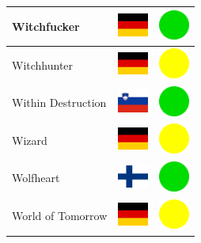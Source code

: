 \documentclass[12pt, a4paper, twoside]{report}
\begin{document}
\begin{center}
\begin{longtable}{|p{5cm}|p{2cm}|p{2cm}|}
Witchfucker & \includegraphics[width=1cm]{4x3/de} & \includegraphics[width=1cm]{likes/y} \\ \hline
Witchhunter & \includegraphics[width=1cm]{4x3/de} & \includegraphics[width=1cm]{likes/m} \\ \hline
Within Destruction & \includegraphics[width=1cm]{4x3/si} & \includegraphics[width=1cm]{likes/y} \\ \hline
Wizard & \includegraphics[width=1cm]{4x3/de} & \includegraphics[width=1cm]{likes/m} \\ \hline
Wolfheart & \includegraphics[width=1cm]{4x3/fi} & \includegraphics[width=1cm]{likes/y} \\ \hline
World of Tomorrow & \includegraphics[width=1cm]{4x3/de} & \includegraphics[width=1cm]{likes/m} \\ \hline

\end{longtable}
\end{center}
\end{document}
